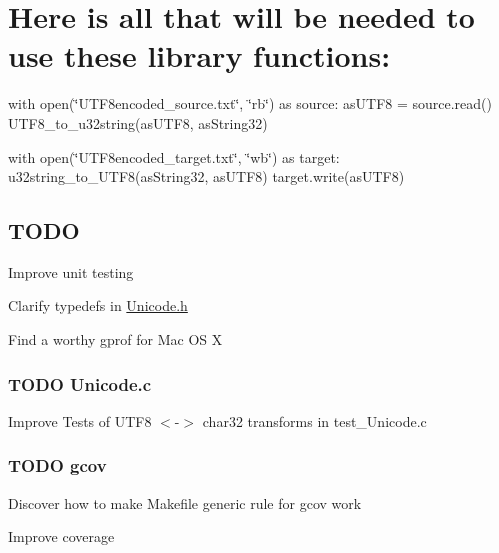 \section*{Here is all that will be needed to use these library functions\+:}

with open(\char`\"{}\+U\+T\+F8encoded\+\_\+source.\+txt\char`\"{}, \char`\"{}rb\char`\"{}) as source\+: as\+U\+T\+F8 = source.\+read() U\+T\+F8\+\_\+to\+\_\+u32string(as\+U\+T\+F8, as\+String32)

with open(\char`\"{}\+U\+T\+F8encoded\+\_\+target.\+txt\char`\"{}, \char`\"{}wb\char`\"{}) as target\+: u32string\+\_\+to\+\_\+\+U\+T\+F8(as\+String32, as\+U\+T\+F8) target.\+write(as\+U\+T\+F8)

\subsection*{T\+O\+D\+O}


\begin{DoxyItemize}
\item Improve unit testing
\item Clarify typedefs in \hyperlink{_unicode_8h_source}{Unicode.\+h}
\item Find a worthy gprof for Mac O\+S X
\end{DoxyItemize}

\subsubsection*{T\+O\+D\+O Unicode.\+c}


\begin{DoxyItemize}
\item Improve Tests of U\+T\+F8 $<$-\/$>$ char32 transforms in test\+\_\+\+Unicode.\+c
\end{DoxyItemize}

\subsubsection*{T\+O\+D\+O gcov}


\begin{DoxyItemize}
\item Discover how to make Makefile generic rule for gcov work
\item Improve coverage 
\end{DoxyItemize}